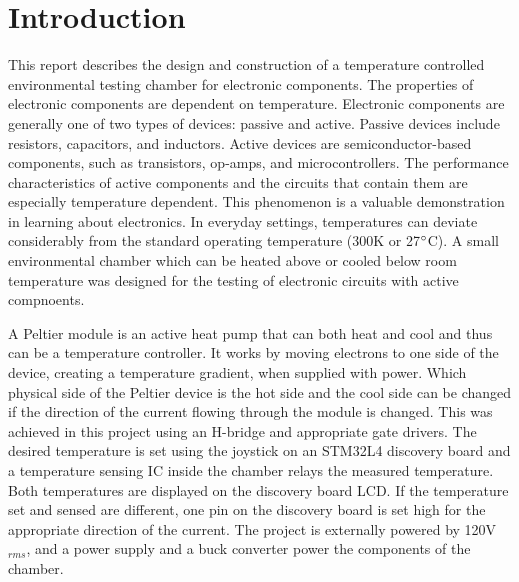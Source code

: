 \documentclass[11pt,letter]{article}
\begin{document}
\newpage %
\tableofcontents

\newpage
\listoffigures

\newpage 
\clearpage



\section{Introduction}
This report describes the design and construction of a temperature controlled environmental testing chamber for electronic components. The properties of electronic components are dependent on temperature. Electronic components are generally one of two types of devices: passive and active. Passive devices include resistors, capacitors, and inductors. Active devices are semiconductor-based components, such as transistors, op-amps, and microcontrollers. The performance characteristics of active components and the circuits that contain them are especially temperature dependent. This phenomenon is a valuable demonstration in learning about electronics. In everyday settings, temperatures can deviate considerably from the standard operating temperature (300K or 27$\degree$C). A small environmental chamber which can be heated above or cooled below room temperature was designed for the testing of electronic circuits with active compnoents. 

A Peltier module is an active heat pump that can both heat and cool and thus can be a temperature controller. It works by moving electrons to one side of the device, creating a temperature gradient, when supplied with power. Which physical side of the Peltier device is the hot side and the cool side can be changed if the direction of the current flowing through the module is changed. This was achieved in this project using an H-bridge and appropriate gate drivers. The desired temperature is set using the joystick on an STM32L4 discovery board and a temperature sensing IC inside the chamber relays the measured temperature. Both temperatures are displayed on the discovery board LCD. If the temperature set and sensed are different, one pin on the discovery board is set high for the appropriate direction of the current. The project is externally powered by 120V$_{rms}$, and a power supply and a buck converter power the components of the chamber.  
\end{document}
